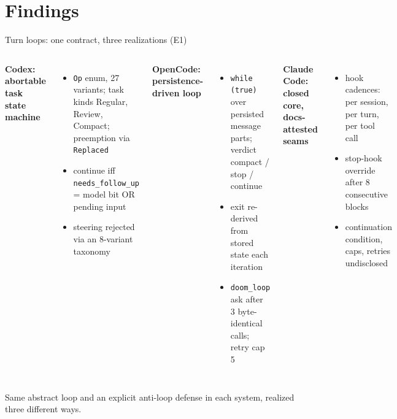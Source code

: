 \documentclass[aspectratio=169,11pt]{beamer}
\newcommand{\codex}[0]{Codex}
\newcommand{\occ}[0]{OpenCode}
\newcommand{\ccc}[0]{Claude Code}
\begin{document}
\section{Findings}

\begin{frame}{Turn loops: one contract, three realizations (E1)}
  \small
  \begin{columns}[T]
      \textbf{\codex{}: abortable task state machine}
      \begin{itemize}
        \item \texttt{Op} enum, 27 variants; task kinds Regular, Review,
          Compact; preemption via \texttt{Replaced}~\citep{codexRepo}
        \item continue iff \texttt{needs\_follow\_up} = model bit OR
          pending input
        \item steering rejected via an 8-variant taxonomy
      \end{itemize}
      \textbf{\occ{}: persistence-driven loop}
      \begin{itemize}
        \item \texttt{while (true)} over persisted message parts; verdict
          compact / stop / continue~\citep{opencodeRepo}
        \item exit re-derived from stored state each iteration
        \item \texttt{doom\_loop} ask after 3 byte-identical calls;
          retry cap 5
      \end{itemize}
      \textbf{\ccc{}: closed core, docs-attested seams}
      \begin{itemize}
        \item hook cadences: per session, per turn, per tool
          call~\citep{claudeCodeHooksDocs}
        \item stop-hook override after 8 consecutive blocks
        \item continuation condition, caps, retries undisclosed
      \end{itemize}
  \end{columns}

  \medskip
  Same abstract loop and an explicit anti-loop defense in each system,
  realized three different ways.
\end{frame}
\end{document}
